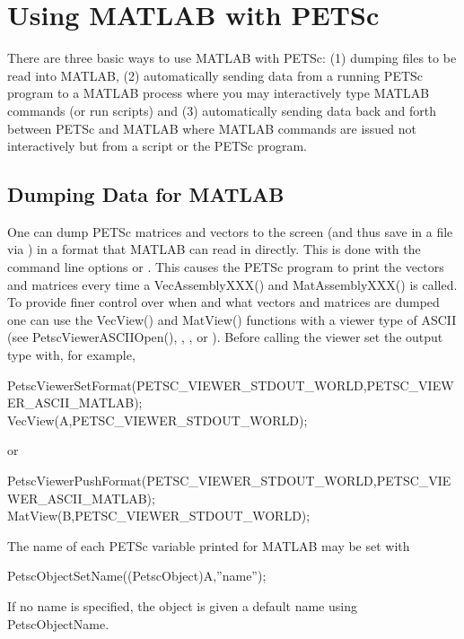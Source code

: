 \chapter{Using MATLAB with PETSc}
\label{ch_matlab}

There are three basic ways to use MATLAB with PETSc: (1) dumping files to 
be read into MATLAB, (2) automatically sending data from a running PETSc program
to a MATLAB process where you may interactively type MATLAB commands (or run
scripts) and (3) automatically sending data back and forth between PETSc and 
MATLAB where MATLAB commands are issued not interactively but from a script or
the PETSc program.

\section{Dumping Data for MATLAB}
One can dump PETSc matrices and vectors to the screen (and thus save in a file via
) in a format that MATLAB can read in directly. This is done with the
command line options  or . This causes the PETSc program
to print the vectors and matrices every time a VecAssemblyXXX() and MatAssemblyXXX()
is called.   To provide finer control
over when and what vectors and matrices are dumped one can use the VecView() and 
MatView() functions with a viewer type of ASCII (see PetscViewerASCIIOpen(), 
, , or ). Before calling
the viewer set the output type with, for example, 
\begin{tabbing}
  PetscViewerSetFormat(PETSC_VIEWER_STDOUT_WORLD,PETSC\_VIEWER\_ASCII\_MATLAB);\\
  VecView(A,PETSC_VIEWER_STDOUT_WORLD);
\end{tabbing}
or 
\begin{tabbing}
  PetscViewerPushFormat(PETSC_VIEWER_STDOUT_WORLD,PETSC\_VIEWER\_ASCII\_MATLAB);\\
  MatView(B,PETSC_VIEWER_STDOUT_WORLD);
\end{tabbing}
The name of each PETSc variable printed for MATLAB may be set with
\begin{tabbing}
PetscObjectSetName((PetscObject)A,''name'');
\end{tabbing}
If no name is specified, the object is given a default name using PetscObjectName.

